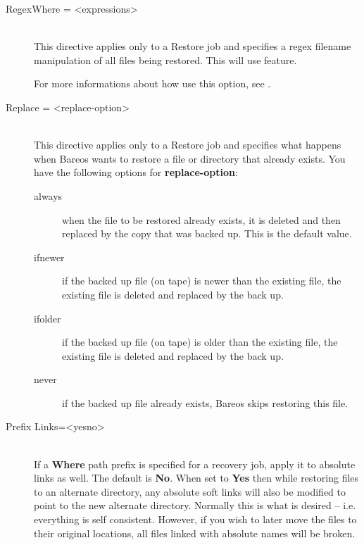 \begin{description}
\item [RegexWhere = {\textless}expressions{\textgreater}] \hfill \\
This directive applies only to a Restore job and specifies a regex filename
manipulation of all files being restored.  This will use  feature.

For more informations about how use this option, see
.

\item [Replace = {\textless}replace-option{\textgreater}] \hfill \\
This directive applies only to a Restore job and specifies what happens
when Bareos wants to restore a file or directory that already exists.
You have the following options for {\bf replace-option}:

\begin{description}

\item [always]
when the file to be restored already exists, it is deleted and then
replaced by the copy that was backed up.  This is the default value.

\item [ifnewer]
if the backed up file (on tape) is newer than the existing file, the
existing file is deleted and replaced by the back up.

\item [ifolder]
if the backed up file (on tape) is older than the existing file, the
existing file is deleted and replaced by the back up.

\item [never]
if the backed up file already exists, Bareos skips  restoring this file.
\end{description}

\item [Prefix Links={\textless}yes{\textbar}no{\textgreater}] \hfill \\
If a {\bf Where} path prefix is specified for a recovery job, apply it
to absolute links as well.  The default is {\bf No}.  When set to {\bf
Yes} then while restoring files to an alternate directory, any absolute
soft links will also be modified to point to the new alternate
directory.  Normally this is what is desired -- i.e.  everything is self
consistent.  However, if you wish to later move the files to their
original locations, all files linked with absolute names will be broken.


\end{description}
